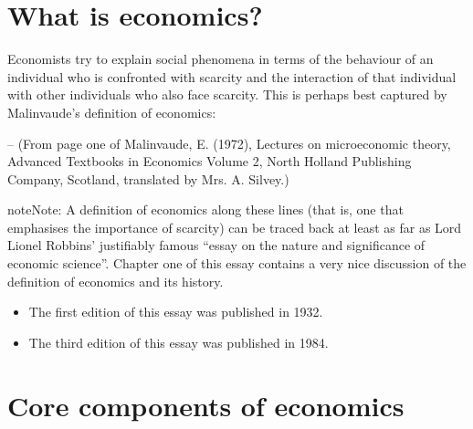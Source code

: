 \documentclass[letterpaper,10pt,english]{jupyterBook}
\begin{document}
\section{What is economics?}
\label{\detokenize{01.intro_to_economics:what-is-economics}}
\sphinxAtStartPar
Economists try to explain social phenomena in terms of the behaviour of an individual who is confronted with scarcity and the interaction of that individual with other individuals who also face scarcity. This is perhaps best captured by Malinvaude’s definition of economics:
\begin{quote}

\sphinxAtStartPar
{}
\end{quote}

\sphinxAtStartPar
– (From page one of Malinvaude, E. (1972), Lectures on microeconomic theory, Advanced Textbooks in Economics Volume 2, North Holland Publishing Company, Scotland, translated by Mrs. A. Silvey.)

\begin{sphinxadmonition}{note}{Note:}
\sphinxAtStartPar
A definition of economics along these lines (that is, one that emphasises the importance of scarcity) can be traced back at least as far as Lord Lionel Robbins’ justifiably famous “essay on the nature and significance of economic science”. Chapter one of this essay contains a very nice discussion of the definition of economics and its history.
\begin{itemize}
\item {} 
\sphinxAtStartPar
The first edition of this essay was published in 1932.

\item {} 
\sphinxAtStartPar
The third edition of this essay was published in 1984.

\end{itemize}
\end{sphinxadmonition}


\section{Core components of economics}
\label{\detokenize{01.intro_to_economics:core-components-of-economics}}
\end{document}
